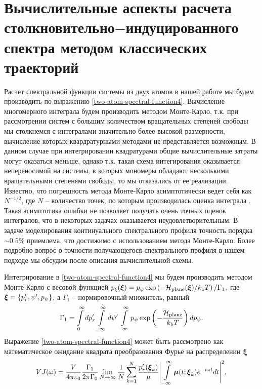 \section{Вычислительные аспекты расчета столкновительно$-$инду\-цированного спектра методом классических траекторий}

Расчет спектральной функции системы из двух атомов в нашей работе мы будем производить по выражению \eqref{two-atom-spectral-function4}. Вычисление многомерного интеграла будем производить методом Монте-Карло, т.к. при рассмотрении систем с большим количеством вращательных степеней свободы мы столкнемся с интегралами значительно более высокой размерности, вычисление которых квардратурными методами не представляется возможным. В данном случае при интегрировании квадратурами общие вычислительные затраты могут оказаться меньше, однако т.к. такая схема интегирования оказывается непереносимой на системы, в которых мономеры обладают несколькими вращательными степенями свободы, то мы отказались от ее реализации. Известно, что погрешность метода Монте-Карло асимптотически ведет себя как $N^{-1/2}$, где $N$ -- количество точек, по которым производилась оценка интеграла \cite{sobol}. Такая асимптотика ошибки не позволяет получать очень точных оценок интегралов, что в некоторых задачах оказывается неудовлетворительным. В задаче моделирования континуального спектрального профиля точность порядка $\sim 0.5\%$ приемлема, что достижимо с использованием метода Монте-Карло. Более подробно вопрос о точности получающегося спектрального профиля в нашем подходе мы обсудим после описания вычислительной схемы. \par
Интегрирование в \eqref{two-atom-spectral-function4} мы будем производить методом Монте-Карло с весовой функцией $p_\xi(\boldsymbol{\xi}) = p_\psi \exp \left( -\mathcal{H}_\text{plane}(\boldsymbol{\xi}) / k_\text{b} T \right) / \Gamma_1$, где $\boldsymbol{\xi} = \left\{ p_r^\prime, \psi^\prime, p_\psi \right\}$, а $\Gamma_1$ -- нормировочный множитель, равный
\begin{gather}
    \Gamma_1 = \int\limits_0^\infty dp_r^\prime \int\limits_{-\infty}^\infty d\psi^\prime \int\limits_{-\infty}^\infty p_\psi \exp \left( -\frac{\mathcal{H}_\text{plane}}{k_\text{b} T} \right) dp_\psi.
\end{gather}
Выражение \eqref{two-atom-spectral-function4} может быть рассмотрено как математическое ожидание квадрата преобразования Фурье на распределении $\boldsymbol{\xi}$
\begin{gather}
    V J(\omega) = \frac{V}{4 \pi \varepsilon_0} \frac{\Gamma_1}{2 \pi \Gamma_0} \lim_{N \rightarrow \infty} \frac{1}{N} \sum_{k = 1}^N \frac{p_r^\prime(\boldsymbol{\xi}_k)}{\mu} \Bigg\vert \int\limits_{-\infty}^\infty \boldsymbol{\mu}(t; \boldsymbol{\xi}_k) e^{-i \omega t} dt \Bigg\vert^2, \label{two-atom-spectral-function-mc}
\end{gather}
